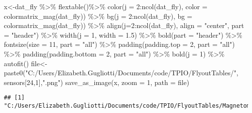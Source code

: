 \documentclass[
]{article}
\newenvironment{Shaded}{\begin{snugshade}}{\end{snugshade}}
\newcommand{\AttributeTok}[1]{\textcolor[rgb]{0.77,0.63,0.00}{#1}}
\newcommand{\DecValTok}[1]{\textcolor[rgb]{0.00,0.00,0.81}{#1}}
\newcommand{\FloatTok}[1]{\textcolor[rgb]{0.00,0.00,0.81}{#1}}
\newcommand{\FunctionTok}[1]{\textcolor[rgb]{0.00,0.00,0.00}{#1}}
\newcommand{\NormalTok}[1]{#1}
\newcommand{\OtherTok}[1]{\textcolor[rgb]{0.56,0.35,0.01}{#1}}
\newcommand{\SpecialCharTok}[1]{\textcolor[rgb]{0.00,0.00,0.00}{#1}}
\newcommand{\StringTok}[1]{\textcolor[rgb]{0.31,0.60,0.02}{#1}}
\begin{document}
\begin{Shaded}
\begin{Highlighting}[]
\NormalTok{x}\OtherTok{\textless{}{-}}\NormalTok{dat\_fly }\SpecialCharTok{\%\textgreater{}\%}
    \FunctionTok{flextable}\NormalTok{()}\SpecialCharTok{\%\textgreater{}\%}
    \FunctionTok{color}\NormalTok{(}\AttributeTok{j =} \DecValTok{2}\SpecialCharTok{:}\FunctionTok{ncol}\NormalTok{(dat\_fly), }\AttributeTok{color =} \FunctionTok{colormatrix\_mag}\NormalTok{(dat\_fly)) }\SpecialCharTok{\%\textgreater{}\%}
    \FunctionTok{bg}\NormalTok{(}\AttributeTok{j =} \DecValTok{2}\SpecialCharTok{:}\FunctionTok{ncol}\NormalTok{(dat\_fly), }\AttributeTok{bg =} \FunctionTok{colormatrix\_mag}\NormalTok{(dat\_fly)) }\SpecialCharTok{\%\textgreater{}\%}
    \FunctionTok{align}\NormalTok{(}\AttributeTok{j=}\DecValTok{2}\SpecialCharTok{:}\FunctionTok{ncol}\NormalTok{(dat\_fly), }\AttributeTok{align =} \StringTok{"center"}\NormalTok{, }\AttributeTok{part =} \StringTok{"header"}\NormalTok{) }\SpecialCharTok{\%\textgreater{}\%}
    \FunctionTok{width}\NormalTok{(}\AttributeTok{j =} \DecValTok{1}\NormalTok{, }\AttributeTok{width =} \FloatTok{1.5}\NormalTok{) }\SpecialCharTok{\%\textgreater{}\%}
    \FunctionTok{bold}\NormalTok{(}\AttributeTok{part =} \StringTok{"header"}\NormalTok{) }\SpecialCharTok{\%\textgreater{}\%}
    \FunctionTok{fontsize}\NormalTok{(}\AttributeTok{size =} \DecValTok{11}\NormalTok{, }\AttributeTok{part =} \StringTok{"all"}\NormalTok{) }\SpecialCharTok{\%\textgreater{}\%}
    \FunctionTok{padding}\NormalTok{(}\AttributeTok{padding.top =} \DecValTok{2}\NormalTok{, }\AttributeTok{part =} \StringTok{"all"}\NormalTok{) }\SpecialCharTok{\%\textgreater{}\%}
    \FunctionTok{padding}\NormalTok{(}\AttributeTok{padding.bottom =} \DecValTok{2}\NormalTok{, }\AttributeTok{part =} \StringTok{"all"}\NormalTok{) }\SpecialCharTok{\%\textgreater{}\%}
    \FunctionTok{bold}\NormalTok{(}\AttributeTok{j =} \DecValTok{1}\NormalTok{) }\SpecialCharTok{\%\textgreater{}\%} \FunctionTok{autofit}\NormalTok{()}
\NormalTok{file}\OtherTok{\textless{}{-}}\FunctionTok{paste0}\NormalTok{(}\StringTok{"C:/Users/Elizabeth.Gugliotti/Documents/code/TPIO/FlyoutTables/"}\NormalTok{, sensors[}\DecValTok{24}\NormalTok{,}\DecValTok{1}\NormalTok{],}\StringTok{".png"}\NormalTok{)}
\FunctionTok{save\_as\_image}\NormalTok{(x, }\AttributeTok{zoom =} \DecValTok{1}\NormalTok{, }\AttributeTok{path =}\NormalTok{ file)}
\end{Highlighting}
\end{Shaded}

\begin{verbatim}
## [1] "C:/Users/Elizabeth.Gugliotti/Documents/code/TPIO/FlyoutTables/Magnetometer.png"
\end{verbatim}
\end{document}
